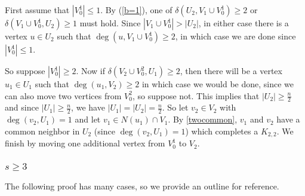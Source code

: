 \documentclass[oneside,12pt]{memoir}
\begin{document}
First assume that $|V_0^1|\leq 1$.  By (\ref{b=1}), one of $\delta(U_2, V_1\cup V_0^1)\geq 2$ or $\delta(V_1\cup V_0^1, U_2)\geq 1$ must hold.  Since $|V_1\cup V_0^1|>|U_2|$, in either case there is a vertex $u\in U_2$ such that $\deg(u, V_1\cup V_0^1)\geq 2$, in which case we are done since $|V_0^1|\leq 1$.

So suppose $|V_0^1|\geq 2$.  Now if $\delta(V_2\cup V_0^2, U_1)\geq 2$, then there will be a vertex $u_1\in U_1$ such that $\deg(u_1, V_2)\geq 2$ in which case we would be done, since we can also move two vertices from $V_0^2$, so suppose not.  This implies that $|U_2|\geq \frac{n}{2}$ and since $|U_1|\geq \frac{n}{2}$, we have $|U_1|=|U_2|=\frac{n}{2}$.  So let $v_2\in V_2$ with $\deg(v_2, U_1)=1$ and let $v_1\in N(u_1)\cap V_1$.  By \eqref{twocommon}, $v_1$ and $v_2$ have a common neighbor in $U_2$ (since $\deg(v_2, U_1)=1$) which completes a $K_{2,2}$.  We finish by moving one additional vertex from $V_0^1$ to $V_2$.





\subsubsection*{$s\geq 3$}

The following proof has many cases, so we provide an outline for reference.
\end{document}
